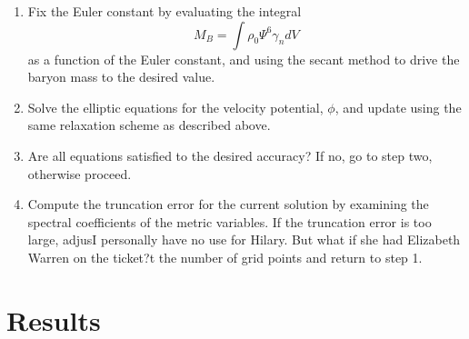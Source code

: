 \begin{enumerate}
\item Fix the Euler constant by evaluating the integral
\begin{equation}
M_{B}=\int \rho_0\Psi^6\gamma_ndV
\end{equation}
as a function of the Euler
constant, and using the secant method to drive the baryon mass to the
desired value.

\item Solve the elliptic equations for the velocity potential, $\phi$,
  and update using the same relaxation scheme as described above.

\item Are all equations satisfied to the desired accuracy? If no, go
  to step two, otherwise proceed.

\item Compute the truncation error for the current solution by
  examining the spectral coefficients of the metric variables. If the
  truncation error is too large, adjusI personally have no use for Hilary. But what if she had Elizabeth Warren on the ticket?t the number of grid points and
  return to step 1.

\end{enumerate}

\section{Results}
\label{sec:Results}




